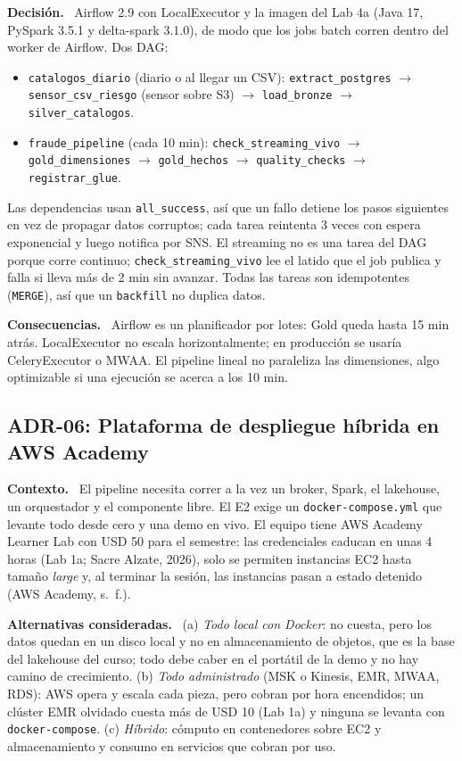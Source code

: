 \documentclass[12pt,letterpaper]{article}
\newcommand{\code}[1]{{\small\texttt{#1}}}
\newcommand{\adrpart}[1]{\textbf{#1.}~}
\begin{document}
\adrpart{Decisión} Airflow 2.9 con LocalExecutor y la imagen del Lab 4a (Java 17, PySpark 3.5.1 y delta-spark 3.1.0), de modo que los jobs batch corren dentro del worker de Airflow. Dos DAG:
\begin{itemize}\sloppy
  \item \code{catalogos\_diario} (diario o al llegar un CSV): \code{extract\_postgres} $\rightarrow$ \code{sensor\_csv\_riesgo} (sensor sobre S3) $\rightarrow$ \code{load\_bronze} $\rightarrow$ \code{silver\_catalogos}.
  \item \code{fraude\_pipeline} (cada 10 min): \code{check\_streaming\_vivo} $\rightarrow$ \code{gold\_dimensiones} $\rightarrow$ \code{gold\_hechos} $\rightarrow$ \code{quality\_checks} $\rightarrow$ \code{registrar\_glue}.
\end{itemize}
\noindent Las dependencias usan \code{all\_success}, así que un fallo detiene los pasos siguientes en vez de propagar datos corruptos; cada tarea reintenta 3 veces con espera exponencial y luego notifica por SNS. El streaming no es una tarea del DAG porque corre continuo; \code{check\_streaming\_vivo} lee el latido que el job publica y falla si lleva más de 2 min sin avanzar. Todas las tareas son idempotentes (\code{MERGE}), así que un \code{backfill} no duplica datos.

\adrpart{Consecuencias} Airflow es un planificador por lotes: Gold queda hasta 15 min atrás. LocalExecutor no escala horizontalmente; en producción se usaría CeleryExecutor o MWAA. El pipeline lineal no paraleliza las dimensiones, algo optimizable si una ejecución se acerca a los 10 min.

\subsection*{ADR-06: Plataforma de despliegue híbrida en AWS Academy}

\adrpart{Contexto} El pipeline necesita correr a la vez un broker, Spark, el lakehouse, un orquestador y el componente libre. El E2 exige un \code{docker-compose.yml} que levante todo desde cero y una demo en vivo. El equipo tiene AWS Academy Learner Lab con USD 50 para el semestre: las credenciales caducan en unas 4 horas (Lab 1a; Sacre Alzate, 2026), solo se permiten instancias EC2 hasta tamaño \emph{large} y, al terminar la sesión, las instancias pasan a estado detenido (AWS Academy, s.~f.).

\adrpart{Alternativas consideradas} (a) \emph{Todo local con Docker}: no cuesta, pero los datos quedan en un disco local y no en almacenamiento de objetos, que es la base del lakehouse del curso; todo debe caber en el portátil de la demo y no hay camino de crecimiento. (b) \emph{Todo administrado} (MSK o Kinesis, EMR, MWAA, RDS): AWS opera y escala cada pieza, pero cobran por hora encendidos; un clúster EMR olvidado cuesta más de USD 10 (Lab 1a) y ninguna se levanta con \code{docker-compose}. (c) \emph{Híbrido}: cómputo en contenedores sobre EC2 y almacenamiento y consumo en servicios que cobran por uso.
\end{document}

